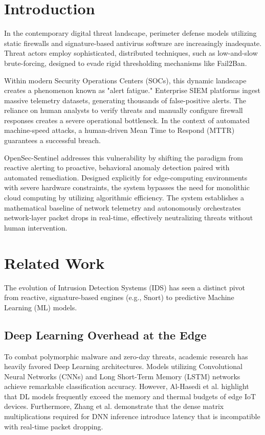 \documentclass[conference]{IEEEtran}
\begin{document}
	\section{Introduction}
	In the contemporary digital threat landscape, perimeter defense models utilizing static firewalls and signature-based antivirus software are increasingly inadequate. Threat actors employ sophisticated, distributed techniques, such as low-and-slow brute-forcing, designed to evade rigid thresholding mechanisms like Fail2Ban. 
	
	Within modern Security Operations Centers (SOCs), this dynamic landscape creates a phenomenon known as "alert fatigue." Enterprise SIEM platforms ingest massive telemetry datasets, generating thousands of false-positive alerts. The reliance on human analysts to verify threats and manually configure firewall responses creates a severe operational bottleneck. In the context of automated machine-speed attacks, a human-driven Mean Time to Respond (MTTR) guarantees a successful breach.
	
	OpenSec-Sentinel addresses this vulnerability by shifting the paradigm from reactive alerting to proactive, behavioral anomaly detection paired with automated remediation. Designed explicitly for edge-computing environments with severe hardware constraints, the system bypasses the need for monolithic cloud computing by utilizing algorithmic efficiency. The system establishes a mathematical baseline of network telemetry and autonomously orchestrates network-layer packet drops in real-time, effectively neutralizing threats without human intervention.
	
	\section{Related Work}
	The evolution of Intrusion Detection Systems (IDS) has seen a distinct pivot from reactive, signature-based engines (e.g., Snort) to predictive Machine Learning (ML) models. 
	
	\subsection{Deep Learning Overhead at the Edge}
	To combat polymorphic malware and zero-day threats, academic research has heavily favored Deep Learning architectures. Models utilizing Convolutional Neural Networks (CNNs) and Long Short-Term Memory (LSTM) networks achieve remarkable classification accuracy. However, Al-Hasedi et al. \cite{alhasedi2025} highlight that DL models frequently exceed the memory and thermal budgets of edge IoT devices. Furthermore, Zhang et al. \cite{zhang2025} demonstrate that the dense matrix multiplications required for DNN inference introduce latency that is incompatible with real-time packet dropping.
	
\end{document}
